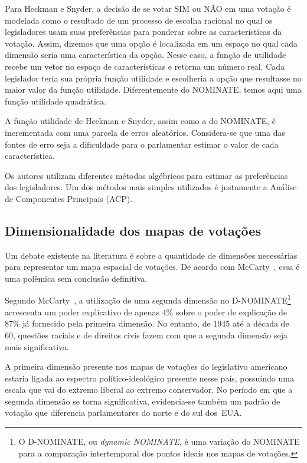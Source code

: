 \documentclass[a4paper, 12pt]{article}
\newcommand\nay{NÃO\xspace}
\newcommand\yea{SIM\xspace}
\newcommand\nominate{NOMINATE\xspace}
\begin{document}
Para Heckman e Snyder, a decisão de se votar \yea ou \nay em uma votação é modelada como o resultado de um processo de escolha racional no qual os legisladores usam suas preferências para ponderar sobre as características da votação. Assim, dizemos que uma opção é localizada em um espaço no qual cada dimensão seria uma característica da opção. Nesse caso, a função de utilidade recebe um vetor no espaço de características e retorna um número real. Cada legislador teria sua própria função utilidade e escolheria a opção que resultasse no maior valor da função utilidade. Diferentemente do NOMINATE, temos aqui uma função utilidade quadrática.

A função utilidade de Heckman e Snyder, assim como a do NOMINATE, é incrementada com uma parcela de erros aleatórios. Considera-se que uma das fontes de erro seja a dificuldade para o parlamentar estimar o valor de cada característica. 

Os autores utilizam diferentes métodos algébricos para estimar as preferências dos legisladores. Um dos métodos mais simples utilizados é justamente a Análise de Componentes Principais (ACP). 

\subsection{Dimensionalidade dos mapas de votações}

Um debate existente na literatura é sobre a quantidade de dimensões necessárias para representar um mapa espacial de votações. De acordo com McCarty~\cite{mccarty2011measuring}, essa é uma polêmica sem conclusão definitiva.

Segundo McCarty~\cite{mccarty2011measuring}, a utilização de uma segunda dimensão no D-NOMINATE\footnote{O D-NOMINATE, ou \emph{dynamic \nominate}, é uma variação do \nominate para a comparação intertemporal dos pontos ideais nos mapas de votações.} acrescenta um poder explicativo de apenas 4\% sobre o poder de explicação de 87\% já fornecido pela primeira dimensão. No entanto, de 1945 até a década de 60, questões raciais e de direitos civis fazem com que a segunda dimensão seja mais significativa. 

A primeira dimensão presente nos mapas de votações do legislativo americano estaria ligada ao espectro político-ideológico presente nesse país, possuindo uma escala que vai do extremo liberal ao extremo conservador. No período em que a segunda dimensão se torna significativa, evidencia-se também um padrão de votação que diferencia parlamentares do norte e do sul dos~EUA.  
\end{document}
